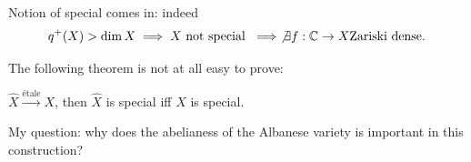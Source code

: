 Notion of special comes in: indeed
 $$
q^+(X)>\dim X \implies X \text{ not special }\implies 
\not\exists f:\mathbb{C}\to X \text{Zariski dense}.  
$$

The following theorem is not at all easy to prove:
\begin{theorem}[Campana]
\label{theorem-campana}
$\hat{X}\xrightarrow{\text{étale} }X$, then
$\hat{X}$ is special iff $X$ is special.
\end{theorem}

\noindent
My question: why does the abelianess of
the Albanese variety is important in this construction?








